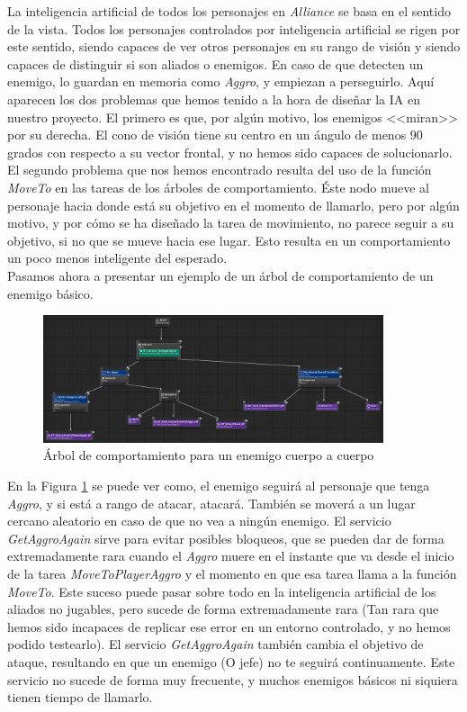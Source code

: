 La inteligencia artificial de todos los personajes en \textit{Alliance} se basa en el sentido de la vista. Todos los personajes controlados por inteligencia artificial se rigen por este sentido, siendo capaces de ver otros personajes en su rango de visión y siendo capaces de distinguir si son aliados o enemigos. En caso de que detecten un enemigo, lo guardan en memoria como \textit{Aggro}, y empiezan a perseguirlo. Aquí aparecen los dos problemas que hemos tenido a la hora de diseñar la \ac{IA} en nuestro proyecto. El primero es que, por algún motivo, los enemigos <<miran>> por su derecha. El cono de visión tiene su centro en un ángulo de menos 90 grados con respecto a su vector frontal, y no hemos sido capaces de solucionarlo. El segundo problema que nos hemos encontrado resulta del uso de la función \textit{MoveTo} en las tareas de los árboles de comportamiento. Éste nodo mueve al personaje hacia donde está su objetivo en el momento de llamarlo, pero por algún motivo, y por cómo se ha diseñado la tarea de movimiento, no parece seguir a su objetivo, si no que se mueve hacia ese lugar. Esto resulta en un comportamiento un poco menos inteligente del esperado.
\\

Pasamos ahora a presentar un ejemplo de un árbol de comportamiento de un enemigo básico. 

\begin{figure}[H]
  \centering
  \includegraphics[width=10cm]{./images/BT_Basic.png}
  \caption{Árbol de comportamiento para un enemigo cuerpo a cuerpo}
  \label{BTBasic}
\end{figure}


En la Figura \ref{BTBasic} se puede ver como, el enemigo seguirá al personaje que tenga \textit{Aggro}, y si está a rango de atacar, atacará. También se moverá a un lugar cercano aleatorio en caso de que no vea a ningún enemigo. El servicio \textit{GetAggroAgain} sirve para evitar posibles bloqueos, que se pueden dar de forma extremadamente rara cuando el \textit{Aggro} muere en el instante que va desde el inicio de la tarea \textit{MoveToPlayerAggro} y el momento en que esa tarea llama a la función \textit{MoveTo}. Este suceso puede pasar sobre todo en la inteligencia artificial de los aliados no jugables, pero sucede de forma extremadamente rara (Tan rara que hemos sido incapaces de replicar ese error en un entorno controlado, y no hemos podido testearlo). El servicio \textit{GetAggroAgain} también cambia el objetivo de ataque, resultando en que un enemigo (O jefe) no te seguirá continuamente. Este servicio no sucede de forma muy frecuente, y muchos enemigos básicos ni siquiera tienen tiempo de llamarlo.
\\

